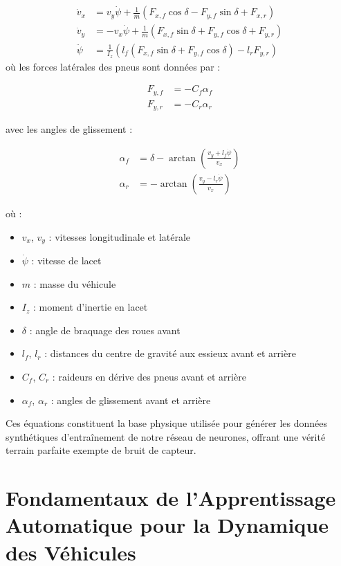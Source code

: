\documentclass[12pt, a4paper]{report}
\begin{document}
\begin{align}
\dot{v}_x &= v_y \dot{\psi} + \frac{1}{m} \left( F_{x,f} \cos{\delta} - F_{y,f} \sin{\delta} + F_{x,r} \right) \\
\dot{v}_y &= -v_x \dot{\psi} + \frac{1}{m} \left( F_{x,f} \sin{\delta} + F_{y,f} \cos{\delta} + F_{y,r} \right) \\
\ddot{\psi} &= \frac{1}{I_z} \left( l_f (F_{x,f} \sin{\delta} + F_{y,f} \cos{\delta}) - l_r F_{y,r} \right)
\end{align}
\newpage
\noindent où les forces latérales des pneus sont données par :

\begin{align}
F_{y,f} &= -C_{f} \alpha_f \\
F_{y,r} &= -C_{r} \alpha_r
\end{align}

\noindent avec les angles de glissement :

\begin{align}
\alpha_f &= \delta - \arctan\left(\frac{v_y + l_f \dot{\psi}}{v_x}\right) \\
\alpha_r &= -\arctan\left(\frac{v_y - l_r \dot{\psi}}{v_x}\right)
\end{align}

\noindent où :
\begin{itemize}
\item $v_x$, $v_y$ : vitesses longitudinale et latérale
\item $\dot{\psi}$ : vitesse de lacet
\item $m$ : masse du véhicule
\item $I_z$ : moment d'inertie en lacet
\item $\delta$ : angle de braquage des roues avant
\item $l_f$, $l_r$ : distances du centre de gravité aux essieux avant et arrière
\item $C_f$, $C_r$ : raideurs en dérive des pneus avant et arrière
\item $\alpha_f$, $\alpha_r$ : angles de glissement avant et arrière
\end{itemize}

Ces équations constituent la base physique utilisée pour générer les données synthétiques d'entraînement de notre réseau de neurones, offrant une vérité terrain parfaite exempte de bruit de capteur.

\section{Fondamentaux de l'Apprentissage Automatique pour la Dynamique des Véhicules}
\label{sec:fondamentaux_ml}
\end{document}
